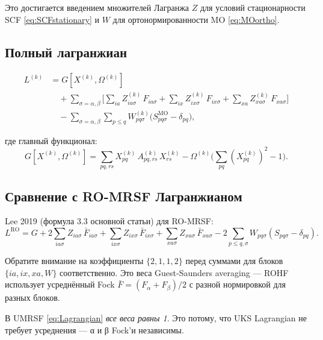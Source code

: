 \documentclass[11pt, a4paper]{article}
\theoremstyle{definition}
\newcommand{\bF}{\bar F}
\newcommand{\Xk}[2]{X^{(#1)}_{#2}}
\newcommand{\Zk}[2]{Z^{(#1)}_{#2}}
\newcommand{\Wk}[2]{W^{(#1)}_{#2}}
\newcommand{\MO}{\text{MO}}
\begin{document}
Это достигается введением множителей Лагранжа $Z$ для условий стационарности SCF \eqref{eq:SCFstationary} и $W$ для ортонормированности MO \eqref{eq:MOortho}.

\subsection{Полный лагранжиан}

\begin{equation}
\boxed{
\begin{aligned}
    L^{(k)} &= G[\Xk{k}{}, \Omega^{(k)}] \\
    &\quad + \sum_{\sigma = \alpha, \beta} \biggl[ \sum_{ia} \Zk{k}{ia\sigma}\, F_{ia\sigma} + \sum_{ix} \Zk{k}{ix\sigma}\, F_{ix\sigma} + \sum_{xa} \Zk{k}{xa\sigma}\, F_{xa\sigma} \biggr] \\
    &\quad - \sum_{\sigma = \alpha, \beta} \sum_{p \le q} \Wk{k}{pq\sigma} \bigl( S^{\MO}_{pq\sigma} - \delta_{pq} \bigr),
\end{aligned}}
\label{eq:Lagrangian}
\end{equation}

где главный функционал:
\begin{equation}
    G[\Xk{k}{}, \Omega^{(k)}] = \sum_{pq, rs} \Xk{k}{pq}\, A^{(k)}_{pq, rs}\, \Xk{k}{rs} - \Omega^{(k)} \biggl( \sum_{pq} (\Xk{k}{pq})^2 - 1 \biggr).
    \label{eq:Gdef}
\end{equation}

\subsection{Сравнение с RO-MRSF Лагранжианом}

Lee 2019 (формула 3.3 основной статьи) для RO-MRSF:
\begin{equation}
    L^{\text{RO}} = G + 2 \sum_{ia\sigma} Z_{ia\sigma}\, \bF_{ia\sigma} + \sum_{ix\sigma} Z_{ix\sigma}\, \bF_{ix\sigma} + \sum_{xa\sigma} Z_{xa\sigma}\, \bF_{xa\sigma} - 2 \sum_{p \le q, \sigma} W_{pq\sigma}(S_{pq\sigma} - \delta_{pq}).
\end{equation}

Обратите внимание на коэффициенты $\{2, 1, 1, 2\}$ перед суммами для блоков $\{ia, ix, xa, W\}$ соответственно. Это веса Guest-Saunders averaging --- ROHF использует усреднённый Fock $\bF = (F_\alpha + F_\beta)/2$ с разной нормировкой для разных блоков.

В UMRSF \eqref{eq:Lagrangian} \emph{все веса равны 1}. Это потому, что UKS Lagrangian не требует усреднения --- α и β Fock'и независимы.
\end{document}
